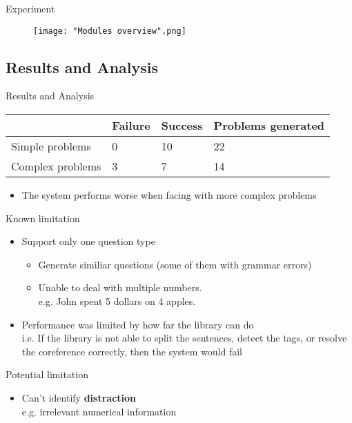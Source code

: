 \documentclass[11pt]{beamer}
\begin{document}
\begin{frame}{Experiment}
    \begin{figure}
    \texttt{[image: "Modules overview".png]}
    \end{figure}
\end{frame}

\subsection{Results and Analysis}

\begin{frame}[allowframebreaks]{Results and Analysis}
    \begin{center}
    \begin{tabular}{| l | l | l | l |}
    \hline
        & Failure & Success & Problems generated \\ \hline
        Simple problems & 0 & 10 & 22 \\ \hline
        Complex problems & 3 & 7 & 14 \\ \hline
    \end{tabular}
    \end{center}
    \begin{itemize}
    \item The system performs worse when facing with more complex problems
    \end{itemize}
    \pagebreak
    \begin{block}{Known limitation}
    \begin{itemize}
        \item Support only one question type
        \begin{itemize}
        \item Generate similiar questions (some of them with grammar errors)
        \item Unable to deal with multiple numbers.\\ e.g. John spent 5 dollars on 4 apples.
        \end{itemize}
        \item Performance was limited by how far the library can do\\
        i.e. If the library is not able to split the sentences, detect the tags, or resolve the coreference correctly, then the system would fail
    \end{itemize}
    \end{block}
    \pagebreak
    \begin{block}{Potential limitation}
    \begin{itemize}
        \item Can't identify \textbf{distraction}\\
        e.g. irrelevant numerical information
    \end{itemize}
    \end{block}
\end{frame}
\end{document}
